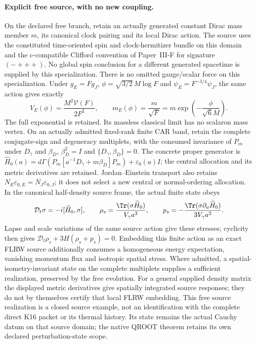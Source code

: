\documentclass[12pt,a4paper]{article}
\begin{document}
\paragraph{Explicit free source, with no new coupling.}
On the declared free branch, retain an actually generated constant Dirac
mass member $m$, its canonical clock pairing and its local Dirac action.
The source uses the constituted time-oriented spin and clock-hermitizer
bundle on this domain and the c-compatible Clifford convention of
Paper~III-F for signature $(-+++)$. No global spin conclusion for a different
generated spacetime is supplied by this specialization.
There is no omitted gauge/scalar force on this specialization. Under
$g_E=Fg_J$, $\phi=\sqrt{3/2}\,M\log F$ and
$\psi_E=F^{-3/4}\psi_J$, the same action gives exactly
\begin{equation}
 \boxed{V_E(\phi)=\frac{M^2\mathcal V(F)}{2F^2},\qquad
 m_E(\phi)=\frac{m}{\sqrt F}
 =m\exp\!\left(-\frac{\phi}{\sqrt6M}\right).}
 \label{p8:eq:v2171-free-dirac-scalaron-coupling}
\end{equation}
The full exponential is retained. Its massless classical limit has no
scalaron mass vertex. On an actually admitted fixed-rank finite CAR band,
retain the complete conjugate-sign and degeneracy multiplets, with the
consumed invariance of $P_m$ under $D_\gamma$ and $\beta_D$,
$\beta_D^2=I$ and $\{D_\gamma,\beta_D\}=0$. The concrete proper generator is
$\widehat H_0(a)=d\Gamma(P_m[a^{-1}D_\gamma+m\beta_D]P_m)
+\varepsilon_0(a)I$; the central allocation and its metric derivatives are
retained. Jordan--Einstein transport also retains
$N_E\varepsilon_{0,E}=N_J\varepsilon_{0,J}$; it does not select a new central
or normal-ordering allocation. In the canonical half-density source frame,
the actual finite state obeys
\[
 \mathcal D_t\sigma=-i[\widehat H_0,\sigma],\qquad
 \rho_s=\frac{\Tr(\sigma\widehat H_0)}{V_\gamma a^3},\qquad
 p_s=-\frac{\Tr(\sigma\partial_a\widehat H_0)}{3V_\gamma a^2}.
\]
Lapse and scale variations of the same source action give these stresses;
cyclicity then gives $\mathcal D_t\rho_s+3H(\rho_s+p_s)=0$.
Embedding this finite action as an exact FLRW source additionally consumes
a homogeneous energy expectation, vanishing momentum flux and isotropic
spatial stress. Where admitted, a spatial-isometry-invariant state on the
complete multiplets supplies a sufficient realization, preserved by the
free evolution. For a general supplied density matrix the displayed metric
derivatives give spatially integrated source responses; they do not by
themselves certify that local FLRW embedding.
This free source realization is a closed source example, not an
identification with the complete direct K16 packet or its thermal history.
Its state remains the actual Cauchy datum on that source domain; the native
QROOT theorem retains its own declared perturbation-state scope.
\end{document}

